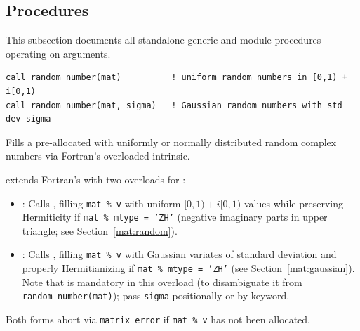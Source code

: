 \subsection{Procedures}
\label{subsec:mat_procs}

This subsection documents all standalone generic and module procedures operating on  arguments.



\lstset{language=[95]Fortran}
\begin{lstlisting}
call random_number(mat)          ! uniform random numbers in [0,1) + i[0,1)
call random_number(mat, sigma)   ! Gaussian random numbers with std dev sigma
\end{lstlisting}

Fills a pre-allocated  with uniformly or normally distributed random complex numbers via Fortran's overloaded  intrinsic.

 extends Fortran's  with two overloads for :
\begin{itemize}
  \item {}: Calls , filling \texttt{mat \% v} with uniform $[0,1) + i[0,1)$ values while preserving Hermiticity if \texttt{mat \% mtype = 'ZH'} (negative imaginary parts in upper triangle; see Section~\ref{mat:random}).
  \item {}: Calls , filling \texttt{mat \% v} with Gaussian variates of standard deviation  and properly Hermitianizing if \texttt{mat \% mtype = 'ZH'} (see Section~\ref{mat:gaussian}). Note that  is mandatory in this overload (to disambiguate it from \texttt{random\_number(mat)}); pass \texttt{sigma} positionally or by keyword.
\end{itemize}
Both forms abort via \texttt{matrix\_error} if \texttt{mat \% v} has not been allocated.

